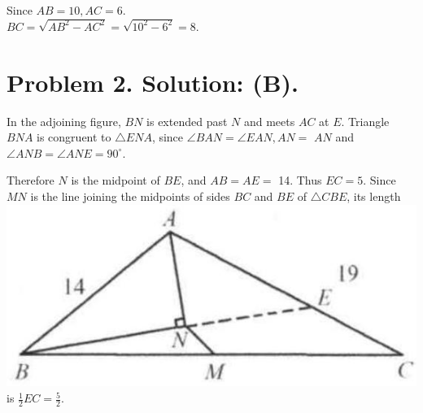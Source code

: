 \documentclass[10pt]{article}
\begin{document}
Since \(A B=10, A C=6\).\\
\(B C=\sqrt{A B^{2}-A C^{2}}=\sqrt{10^{2}-6^{2}}=8\).

\section*{Problem 2. Solution: (B).}
In the adjoining figure, \(B N\) is extended past \(N\) and meets \(A C\) at \(E\). Triangle \(B N A\) is congruent to \(\triangle E N A\), since \(\angle B A N=\angle E A N, A N=\) \(A N\) and \(\angle A N B=\angle A N E=90^{\circ}\).

Therefore \(N\) is the midpoint of \(B E\), and \(A B=A E=\) 14. Thus \(E C=5\). Since \(M N\) is the line joining the midpoints of sides \(B C\) and \(B E\) of \(\triangle C B E\), its length\\
\includegraphics[max width=\textwidth]{2025_04_17_97bc1f7e44d93c271a88g-067(2)} is \(\frac{1}{2} E C=\frac{5}{2}\).
\end{document}

